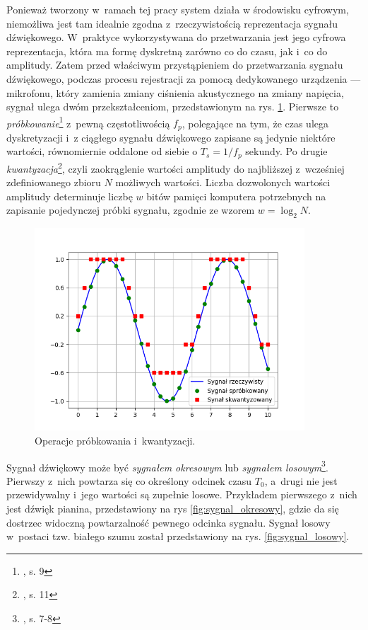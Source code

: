 Ponieważ tworzony w~ramach tej pracy system działa w środowisku cyfrowym, niemożliwa jest tam idealnie zgodna z~rzeczywistością reprezentacja sygnału dźwiękowego. W~praktyce wykorzystywana do przetwarzania jest jego cyfrowa reprezentacja, która ma formę dyskretną zarówno co do czasu, jak i~co do amplitudy. Zatem przed właściwym przystąpieniem do przetwarzania sygnału dźwiękowego, podczas procesu rejestracji za pomocą dedykowanego urządzenia --- mikrofonu, który zamienia zmiany ciśnienia akustycznego na zmiany napięcia, sygnał ulega dwóm przekształceniom, przedstawionym na rys.  \ref{fig:probkowanie_i_kwantyzacja}. Pierwsze to \emph{próbkowanie}\footnote{\cite{lerch_introduction_2012}, s. 9} z~pewną częstotliwością $f_p$, polegające na tym, że czas ulega dyskretyzacji i~z ciągłego sygnału dźwiękowego zapisane są jedynie niektóre wartości, równomiernie oddalone od siebie o $T_s=1/f_p$ sekundy. Po drugie \emph{kwantyzacja}\footnote{\cite{lerch_introduction_2012}, s. 11}, czyli zaokrąglenie wartości amplitudy do najbliższej z~wcześniej zdefiniowanego zbioru $N$ możliwych wartości. Liczba dozwolonych wartości amplitudy determinuje liczbę $w$ bitów pamięci komputera potrzebnych na zapisanie pojedynczej próbki sygnału, zgodnie ze wzorem $w=\log_{2}N$.

\begin{figure}[htb]
    \centering
    \includegraphics[width=0.9\textwidth]{images/probkowanie_i_kwantyzacja}
    \caption{Operacje próbkowania i~kwantyzacji.}
    \label{fig:probkowanie_i_kwantyzacja}
\end{figure}

Sygnał dźwiękowy może być \emph{sygnałem okresowym} lub \emph{sygnałem losowym}\footnote{\cite{lerch_introduction_2012}, s. 7-8}. Pierwszy z~nich powtarza się co określony odcinek czasu $T_0$, a~drugi nie jest przewidywalny i~jego wartości są zupełnie losowe. Przykładem pierwszego z~nich jest dźwięk pianina, przedstawiony na rys \ref{fig:sygnal_okresowy}, gdzie da się dostrzec widoczną powtarzalność pewnego odcinka sygnału.  Sygnał losowy w~postaci tzw. białego szumu został przedstawiony na rys. \ref{fig:sygnal_losowy}.

